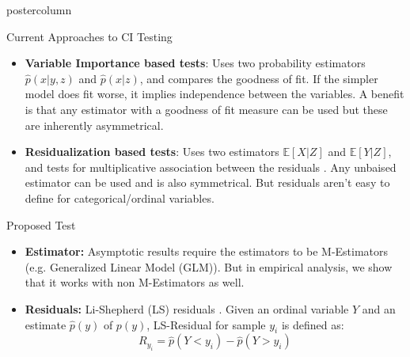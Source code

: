 \documentclass{beamer}
\begin{document}
\begin{frame}
\begin{columns}
\begin{column}{.33\textwidth}
\begin{beamercolorbox}[center]{postercolumn}
\begin{minipage}{.98\textwidth}
{\begin{myblock}{Current Approaches to CI Testing}
\begin{itemize}
							\item \textbf{Variable Importance based tests}: Uses two
								probability estimators $ \hat{p}(x | y, z) $ and $
								\hat{p}(x | z) $, and compares the goodness of fit.
								If the simpler model does fit worse, it implies independence
								between the variables. A benefit is that any estimator with a 
								goodness of fit measure can be used but these are inherently asymmetrical.
							\item \textbf{Residualization based tests}: Uses two estimators $
								\mathbb{E}[X | Z] $ and $ \mathbb{E}[Y|Z] $, and tests
								for multiplicative association between the residuals \cite{Daudin1980}. Any unbaised
								estimator can be used and is also symmetrical. But residuals
								aren't easy to define for categorical/ordinal variables.

						\end{itemize}
					\end{myblock}\vfill
					\begin{myblock}{Proposed Test}
						\begin{itemize}
							\item \textbf{Estimator:} Asymptotic results require the
								estimators to be M-Estimators (e.g. Generalized Linear
								Model (GLM)). But in empirical analysis, we show that it works with non M-Estimators as well.
							\item \textbf{Residuals:} Li-Shepherd (LS) residuals \cite{li2012}.
								Given an ordinal variable $ Y $ and an estimate $ \hat{p}(y) $ of $
								p(y) $, LS-Residual for sample $ y_i $ is defined as:
								$$ R_{y_i} = \hat{p}(Y < y_i) - \hat{p}(Y > y_i) $$


\end{itemize}
\end{myblock}}
\end{minipage}
\end{beamercolorbox}
\end{column}
\end{columns}
\end{frame}
\end{document}
